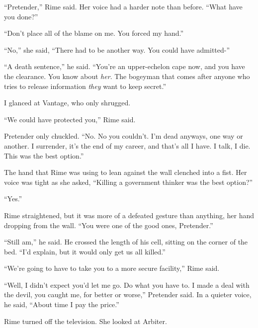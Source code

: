 ``Pretender,'' Rime said.  Her voice had a harder note than before.  ``What have you done?''



``Don't place all of the blame on me.  You forced my hand.''



``No,'' she said, ``There had to be another way.  You could have admitted-''



``A death sentence,'' he said.  ``You're an upper-echelon cape now, and you have the clearance.  You know about \emph{her}.  The bogeyman that comes after anyone who tries to release information \emph{they} want to keep secret.''



I glanced at Vantage, who only shrugged.



``We could have protected you,'' Rime said.



Pretender only chuckled.  ``No.  No you couldn't.  I'm dead anyways, one way or another.  I surrender, it's the end of my career, and that's all I have.  I talk, I die.  This was the best option.''



The hand that Rime was using to lean against the wall clenched into a fist.  Her voice was tight as she asked, ``Killing a government thinker was the best option?''



``Yes.''



Rime straightened, but it was more of a defeated gesture than anything, her hand dropping from the wall.  ``You were one of the good ones, Pretender.''



``Still am,'' he said.  He crossed the length of his cell, sitting on the corner of the bed.  ``I'd explain, but it would only get us all killed.''



``We're going to have to take you to a more secure facility,'' Rime said.



``Well, I didn't expect you'd let me go.  Do what you have to.  I made a deal with the devil, you caught me, for better or worse,'' Pretender said.  In a quieter voice, he said, ``About time I pay the price.''



Rime turned off the television.  She looked at Arbiter.



